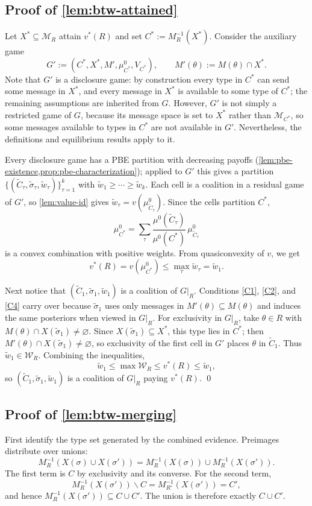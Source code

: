 \documentclass[11pt]{article}
\newcommand{\Msg}{\mathcal{M}}
\newcommand{\W}{\mathcal{W}}
\begin{document}
\subsection*{Proof of \cref{lem:btw-attained}}
Let $X^*\subseteq\Msg_R$ attain $v^*(R)$ and set $C^*:=M^{-1}_R(X^*)$. Consider the auxiliary game
\[
    G':=(C^*,X^*,M',\mu^0_{C^*},V_{C^*}),
    \qquad
    M'(\theta):=M(\theta)\cap X^* .
\]
Note that $G'$ is a disclosure game: by construction every type in $C^*$ can send some message in $X^*$, and every message in $X^*$ is available to some type of $C^*$; the remaining assumptions are inherited from $G$. However, $G'$ is not simply a restricted game of $G$,
because its message space is set to $X^*$ rather than $\Msg_{C^*}$, so some messages available to types in $C^*$ are not available in $G'$.
Nevertheless, the definitions and equilibrium results apply to it.

Every disclosure game has a PBE partition with decreasing payoffs (\cref{lem:pbe-existence,prop:pbe-characterization}); applied to $G'$ this gives a partition $\{(\widetilde C_\tau,\widetilde\sigma_\tau,\widetilde w_\tau)\}_{\tau=1}^k$ with $\widetilde w_1\geq\cdots\geq\widetilde w_k$. Each cell is a coalition in a residual game of $G'$, so \cref{lem:value-id} gives $\widetilde w_\tau=v(\mu^0_{\widetilde C_\tau})$. Since the cells partition $C^*$,
\[
    \mu^0_{C^*}
    =
    \sum_\tau\frac{\mu^0(\widetilde C_\tau)}{\mu^0(C^*)}\,\mu^0_{\widetilde C_\tau}
\]
is a convex combination with positive weights. From quasiconvexity of $v$, we get
\[
    v^*(R)=v(\mu^0_{C^*})\leq\max_\tau\widetilde w_\tau=\widetilde w_1.
\]

Next notice that $(\widetilde{C}_1,\widetilde\sigma_1,\widetilde w_1)$ is a coalition of $G\vert_R$. Conditions \cref{C1}, \cref{C2}, and \cref{C4} carry over because $\widetilde\sigma_1$ uses only messages in $M'(\theta)\subseteq M(\theta)$ and induces the same posteriors when viewed in $G\vert_R$. For exclusivity in $G\vert_R$, take $\theta\in R$ with $M(\theta)\cap X(\widetilde\sigma_1)\neq\varnothing$. Since $X(\widetilde\sigma_1)\subseteq X^*$, this type lies in $C^*$; then $M'(\theta)\cap X(\widetilde\sigma_1)\neq\varnothing$, so exclusivity of the first cell in $G'$ places $\theta$ in $\widetilde C_1$. Thus $\widetilde w_1\in\W_R$. Combining the inequalities,
\[
    \widetilde w_1\leq\max\W_R\leq v^*(R)\leq\widetilde w_1,
\]
so $(\widetilde{C}_1,\widetilde\sigma_1,\widetilde w_1)$ is a coalition of $G\vert_R$ paying $v^*(R)$. \qed

\subsection*{Proof of \cref{lem:btw-merging}}
First identify the type set generated by the combined evidence. Preimages distribute over unions:
\[
    M^{-1}_R(X(\sigma)\cup X(\sigma'))
    =
    M^{-1}_R(X(\sigma))\cup M^{-1}_R(X(\sigma')) .
\]
The first term is $C$ by exclusivity and its converse. For the second term,
\[
    M^{-1}_R(X(\sigma'))\smallsetminus C
    =
    M^{-1}_{R'}(X(\sigma'))
    =
    C',
\]
and hence $M^{-1}_R(X(\sigma'))\subseteq C\cup C'$. The union is therefore exactly $C\cup C'$.
\end{document}
